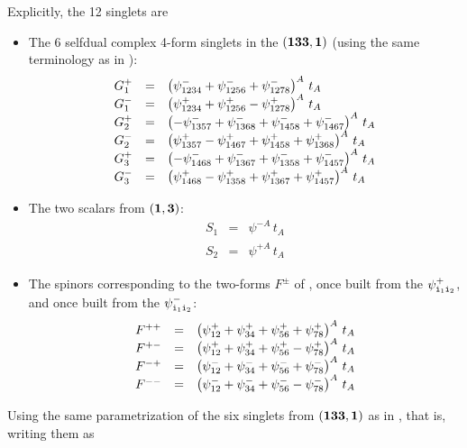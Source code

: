 \documentclass[a4paper,12pt]{article}
\begin{document}
Explicitly, the 12 singlets are
\begin{itemize}

\item The 6 selfdual complex 4-form singlets in the $({\bf 133},{\bf 1})$ (using the same terminology as in \cite{Warner:vz}):
\begin{equation}
\begin{array}{lll}
G_1^+&=&\left(\psi^-_{1234}+\psi^-_{1256}+\psi^-_{1278}\right)^A\,t_A\\
G_1^-&=&\left(\psi^+_{1234}+\psi^+_{1256}-\psi^+_{1278}\right)^A\,t_A\\
G_2^+&=&\left(-\psi^-_{1357}+\psi^-_{1368}+\psi^-_{1458}+\psi^-_{1467}\right)^A\,t_A\\
G_2^-&=&\left(\psi^+_{1357}-\psi^+_{1467}+\psi^+_{1458}+\psi^+_{1368}\right)^A\,t_A\\
G_3^+&=&\left(-\psi^-_{1468}+\psi^-_{1367}+\psi^-_{1358}+\psi^-_{1457}\right)^A\,t_A\\
G_3^-&=&\left(\psi^+_{1468}-\psi^+_{1358}+\psi^+_{1367}+\psi^+_{1457}\right)^A\,t_A
\end{array}
\end{equation}

\item The two scalars from $({\bf 1},{\bf 3})$:
\begin{equation}
\begin{array}{lll}
S_1&=&\psi^{-A}_{}\,t_A\\
S_2&=&\psi^{+A}_{}\,t_A
\end{array}
\end{equation}

\item The spinors corresponding to the two-forms $F^\pm$ of \cite{Warner:vz},
once built from the $\psi^+_{{\tt i}_1{\tt i}_2}$,
and once built from the $\psi^-_{{\tt i}_1{\tt i}_2}$:
\begin{equation}
\begin{array}{lll}
F^{++}&=&\left(\psi^+_{12}+\psi^+_{34}+\psi^+_{56}+\psi^+_{78}\right)^A\,t_A\\
F^{+-}&=&\left(\psi^+_{12}+\psi^+_{34}+\psi^+_{56}-\psi^+_{78}\right)^A\,t_A\\
F^{-+}&=&\left(\psi^-_{12}+\psi^-_{34}+\psi^-_{56}+\psi^-_{78}\right)^A\,t_A\\
F^{--}&=&\left(\psi^-_{12}+\psi^-_{34}+\psi^-_{56}-\psi^-_{78}\right)^A\,t_A
\end{array}
\end{equation}
\end{itemize}

Using the same parametrization of the six singlets from $({\bf 133},{\bf 1})$ as
in \cite{Warner:vz}, that is, writing them as
\end{document}
